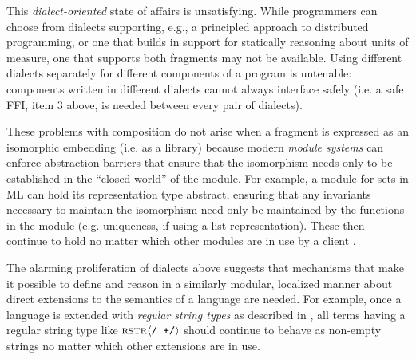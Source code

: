 \documentclass[pldi]{sigplanconf-pldi15}
\begin{document}
This \emph{dialect-oriented} state of affairs is unsatisfying. %
While programmers can choose from dialects supporting, e.g., a principled approach to distributed programming, or one that builds in support for statically reasoning about units of measure, one that supports both fragments may not be available. Using different dialects separately for different components of a program is untenable: components written in different dialects cannot always interface safely (i.e. a safe FFI, item 3 above, is needed between every pair of dialects). %

These problems with composition do not arise when a fragment is expressed as an isomorphic embedding (i.e. as a library) because modern \emph{module systems} can enforce abstraction barriers that ensure that the isomorphism needs only to be established in the ``closed world'' of the module. For example, a module for sets in ML can hold its representation type abstract, ensuring that any invariants necessary to maintain the isomorphism need only be maintained by the functions in the module (e.g. uniqueness, if using a list representation). These then continue to hold no matter which other modules are in use by a client \cite{harper1997programming}.%

The alarming proliferation of dialects above suggests that mechanisms  that make it possible to define and  reason in a similarly modular, localized manner about  direct extensions to the semantics of a language are needed. For example, once a language is extended with \emph{regular string types} as described in \cite{sanitation-psp14}, all terms having a regular string type like ${\textsc{rstr}}\langle\texttt{/.+/}\rangle$ should continue to behave as non-empty strings no matter which other extensions are in use. %
\end{document}
